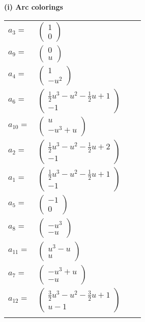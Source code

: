 \documentclass[1p]{elsarticle_modified}
\theoremstyle{definition}
\begin{document}
\flushleft \textbf{(i) Arc colorings}\\
\begin{tabular}{m{7pt} m{180pt} m{7pt} m{180pt} }
\flushright $a_{3}=$&$\begin{pmatrix}1\\0\end{pmatrix}$ \\
\flushright $a_{9}=$&$\begin{pmatrix}0\\u\end{pmatrix}$ \\
\flushright $a_{4}=$&$\begin{pmatrix}1\\- u^2\end{pmatrix}$ \\
\flushright $a_{6}=$&$\begin{pmatrix}\frac{1}{2} u^3- u^2-\frac{1}{2} u+1\\-1\end{pmatrix}$ \\
\flushright $a_{10}=$&$\begin{pmatrix}u\\- u^3+u\end{pmatrix}$ \\
\flushright $a_{2}=$&$\begin{pmatrix}\frac{1}{2} u^3- u^2-\frac{1}{2} u+2\\-1\end{pmatrix}$ \\
\flushright $a_{1}=$&$\begin{pmatrix}\frac{1}{2} u^3- u^2-\frac{1}{2} u+1\\-1\end{pmatrix}$ \\
\flushright $a_{5}=$&$\begin{pmatrix}-1\\0\end{pmatrix}$ \\
\flushright $a_{8}=$&$\begin{pmatrix}- u^3\\- u\end{pmatrix}$ \\
\flushright $a_{11}=$&$\begin{pmatrix}u^3- u\\u\end{pmatrix}$ \\
\flushright $a_{7}=$&$\begin{pmatrix}- u^3+u\\- u\end{pmatrix}$ \\
\flushright $a_{12}=$&$\begin{pmatrix}\frac{3}{2} u^3- u^2-\frac{3}{2} u+1\\u-1\end{pmatrix}$\\&\end{tabular}
\end{document}
